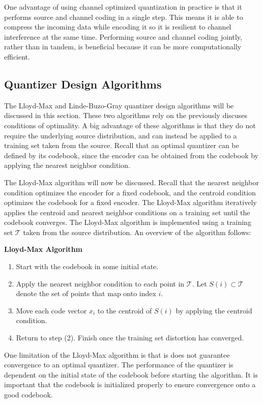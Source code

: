 \documentclass[10pt]{article}
\begin{document}
One advantage of using channel optimized quantization in practice is that it performs source and channel coding in a single step. This means it is able to compress the incoming data while encoding it so it is resilient to channel interference at the same time. Performing source and channel coding jointly, rather than in tandem, is beneficial because it can be more computationally efficient.

\subsection{Quantizer Design Algorithms}
\label{sec:quant_design_algos}
The Lloyd-Max and Linde-Buzo-Gray quantizer design algorithms will be discussed in this section. These two algorithms rely on the previously discuses conditions of optimality. A big advantage of these algorithms is that they do not require the underlying source distribution, and can instead be applied to a training set taken from the source. Recall that an optimal quantizer can be defined by its codebook, since the encoder can be obtained from the codebook by applying the nearest neighbor condition.

The Lloyd-Max algorithm will now be discussed. Recall that the nearest neighbor condition optimizes the encoder for a fixed codebook, and the centroid condition optimizes the codebook for a fixed encoder. The Lloyd-Max algorithm iteratively applies the centroid and nearest neighbor conditions on a training set until the codebook converges. The Lloyd-Max algorithm is implemented using a training set $\mathcal{T}$ taken from the source distribution. An overview of the algorithm follows:

\medskip

{\noindent \bf Lloyd-Max Algorithm}
\begin{enumerate}
\item Start with the codebook in some initial state.
\item Apply the nearest neighbor condition to each point in $\mathcal{T}$. Let $S(i) \subset \mathcal{T}$ denote the set of points that map onto index $i$.
\item Move each code vector $x_i$ to the centroid of $S(i)$ by applying the centroid condition.
\item Return to step (2). Finish once the training set distortion has converged.
\end{enumerate}

One limitation of the Lloyd-Max algorithm is that is does not guarantee convergence to an optimal quantizer. The performance of the quantizer is dependent on the initial state of the codebook before starting the algorithm. It is important that the codebook is initialized properly to ensure convergence onto a good codebook.
\end{document}
